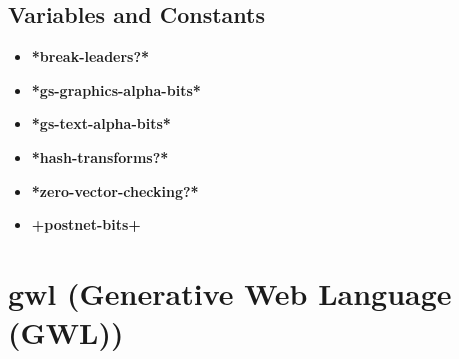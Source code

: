 \documentclass [11pt]{book}
\begin{document}
\subsection{Variables and Constants}

\label{subsec:variablesandconstants}



\begin{itemize}

\item {}
\label{prim:*break-leaders?*}
\textbf{*break-leaders?*}





\item {}
\label{prim:*gs-graphics-alpha-bits*}
\textbf{*gs-graphics-alpha-bits*}





\item {}
\label{prim:*gs-text-alpha-bits*}
\textbf{*gs-text-alpha-bits*}





\item {}
\label{prim:*hash-transforms?*}
\textbf{*hash-transforms?*}





\item {}
\label{prim:*zero-vector-checking?*}
\textbf{*zero-vector-checking?*}





\item {}
\label{prim:+postnet-bits+}
\textbf{+postnet-bits+}





\end{itemize}





\section{gwl (Generative Web Language (GWL))}

\label{sec:gwl(generativeweblanguage(gwl))}
\end{document}
